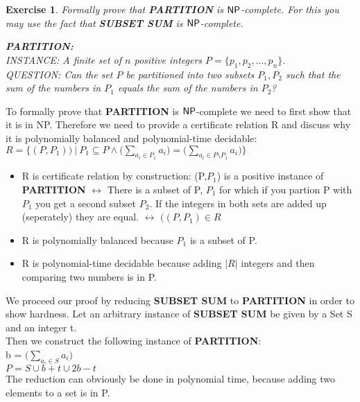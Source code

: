 \documentclass [11pt]{article}
\newtheorem{exercise}[theorem]{Exercise}
\newcommand{\ccfont}[1]{\protect\mathsf{#1}}
\newcommand{\NP}{\ccfont{NP}}
\newcommand{\solution}[1]{\noindent {\bf Solution.}  #1}
\begin{document}
\begin{exercise}
  \label{ex:partition}
  Formally prove that \textbf{PARTITION} is $\NP$-complete. For this you may use
  the fact that \textbf{SUBSET SUM} is $\NP$-complete.   

\medskip     
   
\noindent \textbf{PARTITION:} \\
INSTANCE: A finite set of $n$ positive integers $P=\{p_1, p_2, \ldots, p_n\}$. \\
QUESTION: Can the set $P$ be partitioned into two subsets $P_1, P_2$ such that the sum of the numbers in $P_1$ equals the sum of the numbers in $P_2$? 
  

\end{exercise}



\solution{ 
  To formally prove that \textbf{PARTITION} is $\NP$-complete we need to first show that it is in NP.
  Therefore we need to provide a certificate relation R and discuss why it is polynomially balanced and polynomial-time decidable:\\
  $R=\{(P,P_1)) \ | \  P_1 \subseteq P \wedge \big(\sum_{a_i \in P_1} a_i\big) = \big(\sum_{a_i \in P \setminus P_1} a_i\big) \}$\\
  \begin{itemize}
    \item{
        R is certificate relation by construction: (P,$P_1$) is a positive instance of \textbf{PARTITION} $\leftrightarrow$
        There is a subset of P, $P_1$ for which if you partion P with $P_1$ you get a second subset $P_2$. If the integers in both sets are added up (seperately) they are equal. $\leftrightarrow$ 
      $((P,P_1)\in R$}
    \item{R is polynomially balanced because $P_1$ is a subset of P.}
    \item{R is polynomial-time decidable because adding $|R|$ integers and then comparing two numbers is in P}.
  \end{itemize}
 We proceed our proof by reducing \textbf{SUBSET SUM} to \textbf{PARTITION} in order to show hardness.
 Let an arbitrary instance of \textbf{SUBSET SUM} be given by a Set S and an integer t.\\
 Then we construct the following instance of \textbf{PARTITION}: \\
 b = $\big(\sum_{a_i \in S} a_i \big) $\\
 $P = S \cup b+t \cup 2b-t$ \\
 The reduction can obviously be done in polynomial time, because adding two elements to a set is in P.
}
\end{document}
